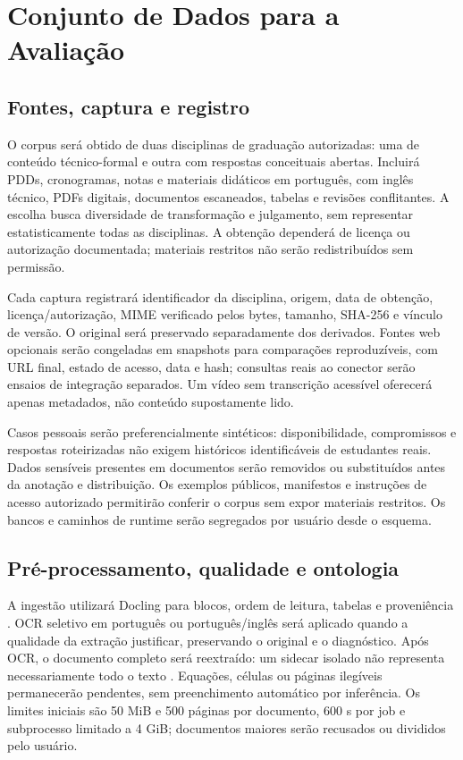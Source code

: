 \documentclass[12pt]{article}
\let\cite\citep
\begin{document}
\section{Conjunto de Dados para a Avaliação}
\label{sec:dados}

\subsection{Fontes, captura e registro}

O corpus será obtido de duas disciplinas de graduação autorizadas: uma de conteúdo técnico-formal e outra com respostas conceituais abertas. Incluirá PDDs, cronogramas, notas e materiais didáticos em português, com inglês técnico, PDFs digitais, documentos escaneados, tabelas e revisões conflitantes. A escolha busca diversidade de transformação e julgamento, sem representar estatisticamente todas as disciplinas. A obtenção dependerá de licença ou autorização documentada; materiais restritos não serão redistribuídos sem permissão.

Cada captura registrará identificador da disciplina, origem, data de obtenção, licença/autorização, MIME verificado pelos bytes, tamanho, SHA-256 e vínculo de versão. O original será preservado separadamente dos derivados. Fontes web opcionais serão congeladas em snapshots para comparações reproduzíveis, com URL final, estado de acesso, data e hash; consultas reais ao conector serão ensaios de integração separados. Um vídeo sem transcrição acessível oferecerá apenas metadados, não conteúdo supostamente lido.

Casos pessoais serão preferencialmente sintéticos: disponibilidade, compromissos e respostas roteirizadas não exigem históricos identificáveis de estudantes reais. Dados sensíveis presentes em documentos serão removidos ou substituídos antes da anotação e distribuição. Os exemplos públicos, manifestos e instruções de acesso autorizado permitirão conferir o corpus sem expor materiais restritos. Os bancos e caminhos de runtime serão segregados por usuário desde o esquema.

\subsection{Pré-processamento, qualidade e ontologia}

A ingestão utilizará Docling para blocos, ordem de leitura, tabelas e proveniência \cite{docling}. OCR seletivo em português ou português/inglês será aplicado quando a qualidade da extração justificar, preservando o original e o diagnóstico. Após OCR, o documento completo será reextraído: um sidecar isolado não representa necessariamente todo o texto \cite{ocrpdf}. Equações, células ou páginas ilegíveis permanecerão pendentes, sem preenchimento automático por inferência. Os limites iniciais são 50 MiB e 500 páginas por documento, 600 s por job e subprocesso limitado a 4 GiB; documentos maiores serão recusados ou divididos pelo usuário.
\end{document}

